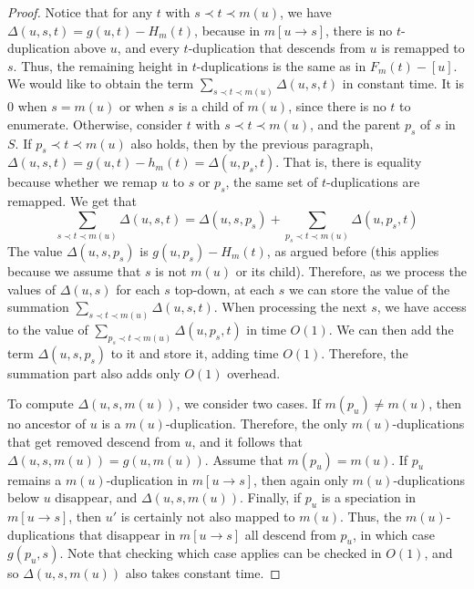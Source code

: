 \documentclass[10pt]{article}
\begin{document}
\begin{proof}
Notice that for any $t$ with $s \prec t \prec m(u)$, 
we have $\Delta(u, s, t) = g(u, t) - H_m(t)$, because in $m[u \rightarrow s]$, there is no $t$-duplication above $u$, and every $t$-duplication that descends from $u$ is remapped to $s$.  Thus, the remaining height in $t$-duplications is the same as in $F_m(t) - [u]$.  
We would like to obtain the term $\sum_{s \prec t \prec m(u)} \Delta(u, s, t)$ in constant time.  It is $0$ when $s = m(u)$ or when $s$ is a child of $m(u)$, since there is no $t$ to enumerate.
Otherwise, consider $t$ with $s \prec t \prec m(u)$, and the parent $p_s$ of $s$ in $S$.  If $p_s \prec t \prec m(u)$ also holds, then by the previous paragraph, $\Delta(u, s, t) = g(u, t) - h_m(t) = \Delta(u, p_s, t)$.  That is, there is equality because whether we remap $u$ to $s$ or $p_s$, the same set of $t$-duplications are remapped.  
We get that 
\[
\sum_{s \prec t \prec m(u)} \Delta(u, s, t) = \Delta(u, s, p_s) + \sum_{p_s \prec t \prec m(u)} \Delta(u, p_s, t)
\]
The value $\Delta(u, s, p_s)$ is $g(u, p_s) - H_m(t)$, as argued before (this applies because we assume that $s$ is not $m(u)$ or its child).  
Therefore, as we process the values of $\Delta(u, s)$ for each $s$ top-down, 
at each $s$ we can store the value of the summation $\sum_{s \prec t \prec m(u)} \Delta(u, s, t)$.  When processing the next $s$, 
we have access to the value of $\sum_{p_s \prec t \prec m(u)} \Delta(u, p_s, t)$ in time $O(1)$.  We can then add the term $\Delta(u, s, p_s)$ to it and store it, adding time $O(1)$.  
Therefore, the summation part also adds only $O(1)$ overhead.

To compute $\Delta(u, s, m(u))$, we consider two cases.  
If $m(p_u) \neq m(u)$, then no ancestor of $u$ is a $m(u)$-duplication.  Therefore, the only $m(u)$-duplications that get removed descend from $u$, and it follows that $\Delta(u, s, m(u)) = g(u, m(u))$.  
Assume that $m(p_u) = m(u)$.  If $p_u$ remains a $m(u)$-duplication in $m[u \rightarrow s]$, then again only $m(u)$-duplications below $u$ disappear, and $\Delta(u, s, m(u))$.  
Finally, if $p_u$ is a speciation in $m[u \rightarrow s]$, then $u'$ is certainly not also mapped to $m(u)$.  Thus, the $m(u)$-duplications that disappear in $m[u \rightarrow s]$ all descend from $p_u$, in which case $g(p_u, s)$. 
Note that checking which case applies can be checked in $O(1)$, and so $\Delta(u, s, m(u))$ also takes constant time.


\end{proof}
\end{document}
